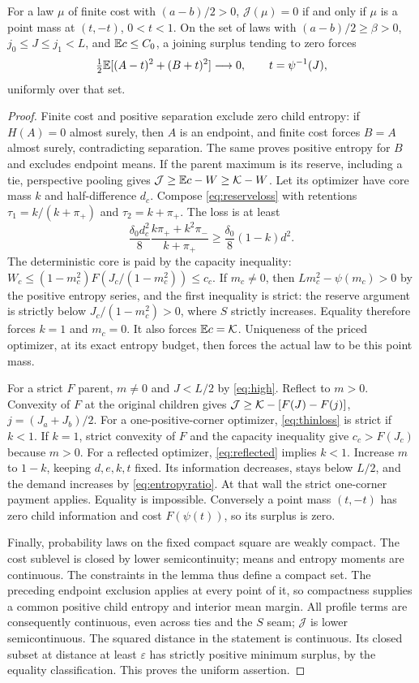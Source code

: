 \begin{lemma}\label{lem:joining}
For a law $\mu$ of finite cost with $(a-b)/2>0$, $\mathcal J(\mu)=0$
if and only if $\mu$ is a point mass at $(t,-t)$, $0<t<1$.
On the set of laws with $(a-b)/2\ge\beta>0$, $j_0\le J\le j_1<L$,
and $\mathbb E c\le C_0$, a joining surplus tending to zero forces
\[
 \tfrac12\mathbb E[(A-t)^2+(B+t)^2]\longrightarrow0,
 \qquad t=\psi^{-1}(J),
\]
uniformly over that set.
\end{lemma}
\begin{proof}
Finite cost and positive separation exclude zero child entropy: if
$H(A)=0$ almost surely, then $A$ is an endpoint, and finite cost forces
$B=A$ almost surely, contradicting separation. The same proves positive
entropy for $B$ and excludes endpoint means.
If the parent maximum is its reserve, including a tie, perspective
pooling gives $\mathcal J\ge\mathbb E c-W\ge\mathcal K-W$.
Let its optimizer have core mass $k$ and half-difference $d_c$.
Compose \eqref{eq:reserveloss} with retentions
$\tau_1=k/(k+\pi_+)$ and $\tau_2=k+\pi_+$. The loss is at least
\[
 \frac{\delta_0d_c^2}{8}
 \frac{k\pi_++k^2\pi_-}{k+\pi_+}
 \ge\frac{\delta_0}{8}(1-k)d^2.
\]
The deterministic core is paid by the capacity inequality:
$W_c\le(1-m_c^2)F(J_c/(1-m_c^2))\le c_c$.
If $m_c\ne0$, then $Lm_c^2-\psi(m_c)>0$ by the positive entropy
series, and the first inequality is strict: the reserve argument is
strictly below $J_c/(1-m_c^2)>0$, where $S$ strictly increases.
Equality therefore forces $k=1$ and $m_c=0$.
It also forces $\mathbb E c=\mathcal K$. Uniqueness of the priced optimizer, at
its exact entropy budget, then forces the actual law to be this point mass.

For a strict $F$ parent, $m\ne0$ and $J<L/2$ by
\eqref{eq:high}. Reflect to $m>0$.
Convexity of $F$ at the original children gives
$\mathcal J\ge\mathcal K-[F(J)-F(j)]$, $j=(J_a+J_b)/2$.
For a one-positive-corner optimizer, \eqref{eq:thinloss} is strict
if $k<1$. If $k=1$, strict convexity of $F$ and the capacity inequality
give $c_c>F(J_c)$ because $m>0$. For a reflected optimizer,
\eqref{eq:reflected} implies $k<1$. Increase $m$ to $1-k$, keeping
$d,e,k,t$ fixed. Its information decreases, stays below $L/2$, and
the demand increases by \eqref{eq:entropyratio}. At that wall the
strict one-corner payment applies. Equality is impossible.
Conversely a point mass $(t,-t)$ has zero child information and cost
$F(\psi(t))$, so its surplus is zero.

Finally, probability laws on the fixed compact square are weakly
compact. The cost sublevel is closed by lower semicontinuity; means
and entropy moments are continuous. The constraints in the lemma thus
define a compact set. The preceding endpoint exclusion applies at every
point of it, so compactness supplies a common positive child entropy
and interior mean margin. All profile terms are consequently continuous,
even across ties and the $S$ seam; $\mathcal J$ is lower semicontinuous.
The squared distance in the statement is continuous. Its closed subset
at distance at least $\varepsilon$ has strictly positive minimum surplus,
by the equality classification. This proves the uniform assertion.
\end{proof}

